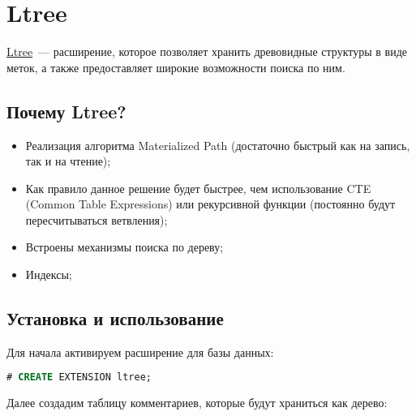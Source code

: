 \section{Ltree}

\href{https://www.postgresql.org/docs/current/static/ltree.html}{Ltree}~--- расширение, которое позволяет хранить древовидные структуры в виде меток, а также предоставляет широкие возможности поиска по ним.

\subsection{Почему Ltree?}

\begin{itemize}
  \item Реализация алгоритма Materialized Path (достаточно быстрый как на запись, так и на чтение);
  \item Как правило данное решение будет быстрее, чем использование CTE (Common Table Expressions) или рекурсивной функции (постоянно будут пересчитываться ветвления);
  \item Встроены механизмы поиска по дереву;
  \item Индексы;
\end{itemize}

\subsection{Установка и использование}

Для начала активируем расширение для базы данных:

\begin{lstlisting}[language=SQL,label=lst:pgltree1,caption=Ltree]
# CREATE EXTENSION ltree;
\end{lstlisting}

Далее создадим таблицу комментариев, которые будут храниться как дерево:

